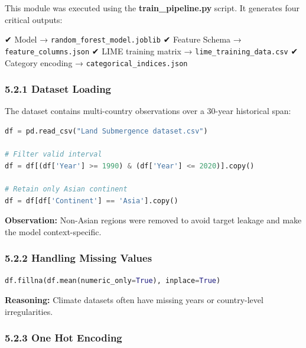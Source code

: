 \documentclass[12pt, a4paper]{article}
\begin{document}
This module was executed using the \textbf{train\_pipeline.py} script. It generates four critical outputs:

✔ Model → \texttt{random\_forest\_model.joblib}  
✔ Feature Schema → \texttt{feature\_columns.json}  
✔ LIME training matrix → \texttt{lime\_training\_data.csv}  
✔ Category encoding → \texttt{categorical\_indices.json}


\subsubsection{\textbf{5.2.1 Dataset Loading}}

The dataset contains multi-country observations over a 30-year historical span:

\begin{lstlisting}[language=Python]
df = pd.read_csv("Land Submergence dataset.csv")

# Filter valid interval
df = df[(df['Year'] >= 1990) & (df['Year'] <= 2020)].copy()

# Retain only Asian continent
df = df[df['Continent'] == 'Asia'].copy()
\end{lstlisting}

\textbf{Observation:}  
Non-Asian regions were removed to avoid target leakage and make the model context-specific.



\subsubsection{\textbf{5.2.2 Handling Missing Values}}

\begin{lstlisting}[language=Python]
df.fillna(df.mean(numeric_only=True), inplace=True)
\end{lstlisting}

\textbf{Reasoning:}  
Climate datasets often have missing years or country-level irregularities.



\subsubsection{\textbf{5.2.3 One Hot Encoding}}
\end{document}

